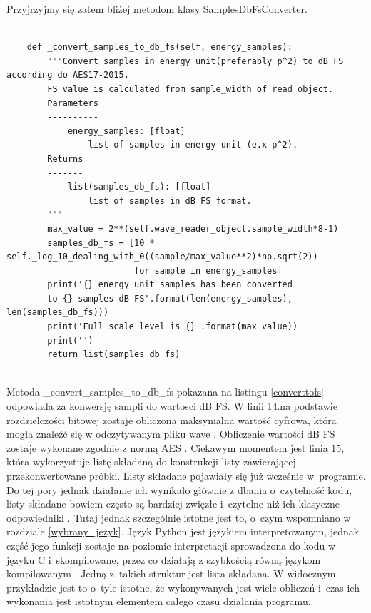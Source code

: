 \documentclass[eng,printmode]{mgr}
\begin{document}
Przyjrzyjmy się zatem bliżej metodom klasy SamplesDbFsConverter.

\begin{minipage}{\linewidth}
\begin{lstlisting}[caption={fragment kodu źródłowego pliku SampledBConverter.py,\newline klasa SamplesDbFSConverter, metoda \_convert\_samples\_to\_db\_fs},captionpos=b,label={converttofs}]

    def _convert_samples_to_db_fs(self, energy_samples):
        """Convert samples in energy unit(preferably p^2) to dB FS according do AES17-2015.
        FS value is calculated from sample_width of read object.
        Parameters
        ----------
            energy_samples: [float]
                list of samples in energy unit (e.x p^2).
        Returns
        -------
            list(samples_db_fs): [float]
                list of samples in dB FS format.
        """
        max_value = 2**(self.wave_reader_object.sample_width*8-1)
        samples_db_fs = [10 * self._log_10_dealing_with_0((sample/max_value**2)*np.sqrt(2))
                         for sample in energy_samples]
        print('{} energy unit samples has been converted
        to {} samples dB FS'.format(len(energy_samples), len(samples_db_fs)))
        print('Full scale level is {}'.format(max_value))
        print('')
        return list(samples_db_fs)
    
\end{lstlisting}
\end{minipage}

Metoda \_convert\_samples\_to\_db\_fs pokazana na listingu \ref{converttofs} odpowiada za konwersję sampli do wartosci dB FS. W linii 14.na podstawie rozdzielczości bitowej zostaje obliczona maksymalna wartość cyfrowa, która mogła znaleźć się w odczytywanym pliku wave \cite{Cyfrowe_przetwarzanie_sygnalow}. Obliczenie wartości dB FS zostaje wykonane zgodnie z normą AES \cite{AES17}. Ciekawym momentem jest linia 15, która wykorzystuje listę składaną do konstrukcji listy zawierającej przekonwertowane próbki. Listy składane pojawiały się już wcześnie w~programie. Do tej pory jednak działanie ich wynikało głównie z dbania o~czytelność kodu, listy składane bowiem często są bardziej zwięzłe i~czytelne niż ich klasyczne odpowiedniki \cite{Python_data_structures}. Tutaj jednak szczególnie istotne jest to, o~czym wspomniano w rozdziale \ref{wybrany_jezyk}. Język Python jest językiem interpretowanym, jednak część jego funkcji zostaje na poziomie interpretacji sprowadzona do kodu w języku C i~skompilowane, przez co działają z szybkością równą językom kompilowanym \cite{Wprowadzenie_python}. Jedną z~takich struktur jest lista składana. W widocznym przykładzie jest to o~tyle istotne, że wykonywanych jest wiele obliczeń i~czas ich wykonania jest istotnym elementem całego czasu działania programu.
\end{document}
